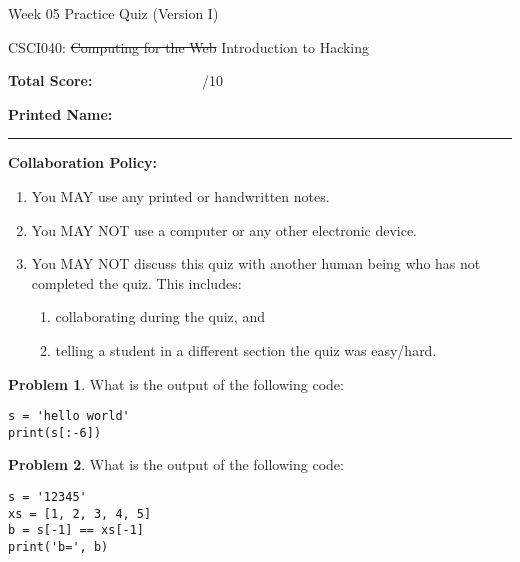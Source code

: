 \documentclass[10pt]{article}
\theoremstyle{definition}
\newtheorem{problem}{Problem}
\begin{document}
\begin{center}
    {
\Large
    Week 05 Practice Quiz (Version I)
}

    \vspace{0.1in}
    CSCI040: \sout{Computing for the Web} Introduction to Hacking

    \vspace{0.1in}
\end{center}


\vspace{0.15in}
\noindent
\textbf{Total Score:} ~~~~~~~~~~~~~~~/10

\vspace{0.5in}
\noindent
\textbf{Printed Name:}

\noindent
\rule{\textwidth}{0.1pt}
\vspace{0.25in}

\noindent
\textbf{Collaboration Policy:}
\begin{enumerate}
    \item You MAY use any printed or handwritten notes.
    \item You MAY NOT use a computer or any other electronic device.
    \item You MAY NOT discuss this quiz with another human being who has not completed the quiz.
        This includes:
        \begin{enumerate}
            \item collaborating during the quiz, and
            \item telling a student in a different section the quiz was easy/hard.
        \end{enumerate}
\end{enumerate}

\vspace{0.15in}

\begin{problem}
    What is the output of the following code:
\end{problem}
\begin{lstlisting}
s = 'hello world'
print(s[:-6])
\end{lstlisting}
\vspace{1in}

\begin{problem}
    What is the output of the following code:
\end{problem}
\begin{lstlisting}
s = '12345'
xs = [1, 2, 3, 4, 5]
b = s[-1] == xs[-1]
print('b=', b)
\end{lstlisting}
\vspace{1.5in}
\end{document}
